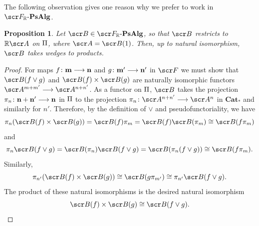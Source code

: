 \documentclass{amsart}
\newtheorem{prop}{Proposition}[section]
\theoremstyle{definition}
\numberwithin{equation}{section}
\newcommand{\bm}{\mathbf{m}}
\newcommand{\bn}{\mathbf{n}}
\newcommand{\FPR}{\sF_{\bR}\text{-}\mathbf{PsAlg}}
\begin{document}
The following observation gives one reason why we prefer to work in $\FPR$.

\begin{prop}\label{wedprod} Let $\sB\in \FPR$, so that $\sB$ restricts to $\bR\sA$ on $\Pi$, where $\sA = \sB(1)$.  Then, up to natural isomorphism,
 $\sB$ takes wedges to products.
\end{prop} 
\begin{proof} For maps $f\colon \bm\rtarr \bn$ and $g \colon \bm' \rtarr \bn'$ in $\sF$ we must  show that $\sB(f\vee g)$ and $\sB(f)\times \sB(g)$ are naturally isomorphic functors $\sA^{m+m'} \rtarr \sA^{n+n'}$.  As a functor on $\Pi$, $\sB$ takes the projection $\pi_n\colon \mathbf{n+n}' \rtarr \bn$ in $\Pi$ to the projection $\pi_n\colon \sA^{n+n'}\rtarr \sA^{n}$ in $\mathbf{Cat}_*$ and similarly for $n'$.  Therefore, by the definition of $\vee$ and pseudofunctoriality, we have
$$ \pi_n(\sB(f) \times \sB(g)) = \sB(f) \pi_m = \sB(f) \sB(\pi_m) \iso \sB(f\pi_m)$$
and
$$ \pi_n\sB(f\vee g) = \sB(\pi_n)\sB(f\vee g) = \sB(\pi_n(f \vee g)) \iso \sB(f\pi_m).$$
Similarly,
$$\pi_{n'}(\sB(f)\times \sB(g)) \iso \sB(g\pi_{m'})\iso \pi_{n'}\sB(f\vee g).$$
 The product of these natural isomorphisms is the desired natural isomorphism 
 $$\sB(f) \times \sB(g) \iso \sB(f\vee g).$$
 \end{proof}

\end{document}
